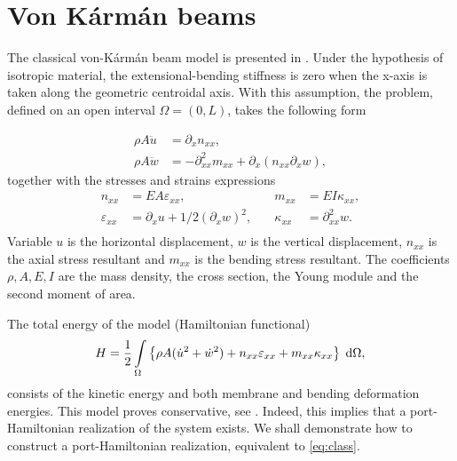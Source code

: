 \documentclass{ifacconf}
\begin{document}
\section{Von K\'arm\'an beams}\label{sec:vK_beams}


The classical von-K\'arm\'an beam model is presented in \cite[Chapter 4]{reddy2010introduction}. Under the hypothesis of isotropic material, the extensional-bending stiffness is zero when the x-axis is taken along the geometric centroidal axis. With this assumption, the problem, defined on an open interval $\Omega = (0, L)$, takes the following form

\begin{equation}\label{eq:class}
	\begin{aligned}
		\rho A \ddot{u} &= \partial_x n_{xx}, \\
		\rho A \ddot{w} &= -\partial^2_{xx} m_{xx} + \partial_x(n_{xx} \partial_x w),
	\end{aligned} 
\end{equation}
together with the stresses and strains expressions
\begin{equation}
	\begin{aligned}
		n_{xx} &= EA \varepsilon_{xx}, \\
		\varepsilon_{xx} &= \partial_x u + 1/2 (\partial_x w)^2, \\
	\end{aligned} \quad
	\begin{aligned}
		m_{xx} &= EI \kappa_{xx}, \\
		\kappa_{xx} &=\partial^2_{xx} w. \\
	\end{aligned} 
\end{equation}
Variable $u$ is the horizontal displacement, $w$ is the vertical displacement, $n_{xx}$ is the axial stress resultant and $m_{xx}$ is the bending stress resultant. The coefficients $\rho, A, E, I$ are the mass density, the cross section, the Young module and the second moment of area.

The total energy of the model (Hamiltonian functional)
\begin{equation}
	H = \frac{1}{2} \int_{\Omega}\left\{\rho A (\dot{u}^2 + \dot{w}^2) + n_{xx} \varepsilon_{xx} + m_{xx} \kappa_{xx} \right\} \d\Omega,
\end{equation}
consists of the kinetic energy and both membrane and bending deformation energies.
This model proves conservative, see \cite{bilbao2015conservative}. Indeed, this implies that a port-Hamiltonian realization of the system exists. We shall demonstrate how to construct a port-Hamiltonian realization, equivalent to \eqref{eq:class}.
\end{document}
